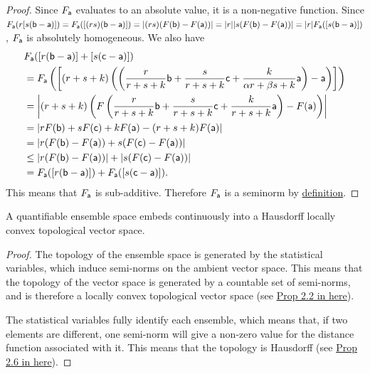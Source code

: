 \begin{proof}
	Since $F_{\ens[a]}$ evaluates to an absolute value, it is a non-negative function. Since $F_{\ens[a]}(r[s(\ens[b]-\ens[a])]) = F_{\ens[a]}([(rs)(\ens[b]-\ens[a])]) = |(rs) (F(\ens[b]) - F(\ens[a]))| = |r| |s (F(\ens[b]) - F(\ens[a]))| = |r| F_{\ens[a]}([s(\ens[b]-\ens[a])])$, $F_{\ens[a]}$ is absolutely homogeneous. We also have
	\begin{equation}
	\begin{aligned}
		&F_{\ens[a]}([r(\ens[b]-\ens[a])] + [s(\ens[c]-\ens[a])])  \\
		&= F_{\ens[a]}\left(\left[(r+s+k) \left(\left(\frac{r}{r+s+k}\ens[b] + \frac{s}{r+s+k} \ens[c] +\frac{k}{\alpha r+ \beta s+k} \ens[a] \right) - \ens[a]\right)\right]\right) \\
		&= \left|(r+s+k)\left(F\left(\frac{r}{r+s+k}\ens[b] + \frac{s}{r+s+k} \ens[c] +\frac{k}{r+s+k} \ens[a]\right) - F(\ens[a]) \right)\right| \\
		&= \left|r F(\ens[b]) + s F(\ens[c]) + k F(\ens[a]) - (r+s+k) F(\ens[a]) \right| \\
		&= \left|r ( F(\ens[b]) - F(\ens[a]))  + s ( F(\ens[c]) - F(\ens[a])) \right| \\
		&\leq \left| r ( F(\ens[b]) - F(\ens[a])) \right| + \left| s ( F(\ens[c]) - F(\ens[a])) \right| \\
		&= F_{\ens[a]}([r(\ens[b]-\ens[a])]) + F_{\ens[a]}([s(\ens[c]-\ens[a])]).
	\end{aligned}
	\end{equation}
	This means that $F_{\ens[a]}$ is sub-additive. Therefore $F_{\ens[a]}$ is a seminorm by \href{https://en.wikipedia.org/wiki/Seminorm}{definition}.
\end{proof}

\begin{prop}
	A quantifiable ensemble space embeds continuously into a Hausdorff locally convex topological vector space.
\end{prop}

\begin{proof}
	The topology of the ensemble space is generated by the statistical variables, which induce semi-norms on the ambient vector space. This means that the topology of the vector space is generated by a countable set of semi-norms, and is therefore a locally convex topological vector space (see \href{https://personal.math.ubc.ca/~cass/research/pdf/TVS.pdf}{Prop 2.2 in here}).
	
	The statistical variables fully identify each ensemble, which means that, if two elements are different, one semi-norm will give a non-zero value for the distance function associated with it. This means that the topology is Hausdorff (see \href{https://personal.math.ubc.ca/~cass/research/pdf/TVS.pdf}{Prop 2.6 in here}).
\end{proof}

